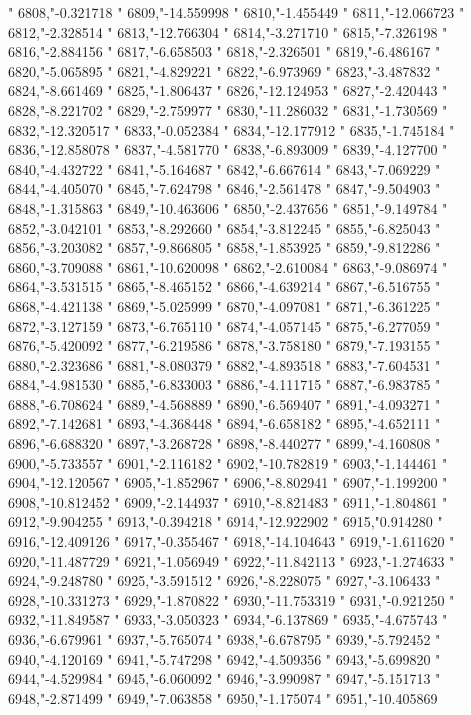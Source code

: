 "
6808,"-0.321718
"
6809,"-14.559998
"
6810,"-1.455449
"
6811,"-12.066723
"
6812,"-2.328514
"
6813,"-12.766304
"
6814,"-3.271710
"
6815,"-7.326198
"
6816,"-2.884156
"
6817,"-6.658503
"
6818,"-2.326501
"
6819,"-6.486167
"
6820,"-5.065895
"
6821,"-4.829221
"
6822,"-6.973969
"
6823,"-3.487832
"
6824,"-8.661469
"
6825,"-1.806437
"
6826,"-12.124953
"
6827,"-2.420443
"
6828,"-8.221702
"
6829,"-2.759977
"
6830,"-11.286032
"
6831,"-1.730569
"
6832,"-12.320517
"
6833,"-0.052384
"
6834,"-12.177912
"
6835,"-1.745184
"
6836,"-12.858078
"
6837,"-4.581770
"
6838,"-6.893009
"
6839,"-4.127700
"
6840,"-4.432722
"
6841,"-5.164687
"
6842,"-6.667614
"
6843,"-7.069229
"
6844,"-4.405070
"
6845,"-7.624798
"
6846,"-2.561478
"
6847,"-9.504903
"
6848,"-1.315863
"
6849,"-10.463606
"
6850,"-2.437656
"
6851,"-9.149784
"
6852,"-3.042101
"
6853,"-8.292660
"
6854,"-3.812245
"
6855,"-6.825043
"
6856,"-3.203082
"
6857,"-9.866805
"
6858,"-1.853925
"
6859,"-9.812286
"
6860,"-3.709088
"
6861,"-10.620098
"
6862,"-2.610084
"
6863,"-9.086974
"
6864,"-3.531515
"
6865,"-8.465152
"
6866,"-4.639214
"
6867,"-6.516755
"
6868,"-4.421138
"
6869,"-5.025999
"
6870,"-4.097081
"
6871,"-6.361225
"
6872,"-3.127159
"
6873,"-6.765110
"
6874,"-4.057145
"
6875,"-6.277059
"
6876,"-5.420092
"
6877,"-6.219586
"
6878,"-3.758180
"
6879,"-7.193155
"
6880,"-2.323686
"
6881,"-8.080379
"
6882,"-4.893518
"
6883,"-7.604531
"
6884,"-4.981530
"
6885,"-6.833003
"
6886,"-4.111715
"
6887,"-6.983785
"
6888,"-6.708624
"
6889,"-4.568889
"
6890,"-6.569407
"
6891,"-4.093271
"
6892,"-7.142681
"
6893,"-4.368448
"
6894,"-6.658182
"
6895,"-4.652111
"
6896,"-6.688320
"
6897,"-3.268728
"
6898,"-8.440277
"
6899,"-4.160808
"
6900,"-5.733557
"
6901,"-2.116182
"
6902,"-10.782819
"
6903,"-1.144461
"
6904,"-12.120567
"
6905,"-1.852967
"
6906,"-8.802941
"
6907,"-1.199200
"
6908,"-10.812452
"
6909,"-2.144937
"
6910,"-8.821483
"
6911,"-1.804861
"
6912,"-9.904255
"
6913,"-0.394218
"
6914,"-12.922902
"
6915,"0.914280
"
6916,"-12.409126
"
6917,"-0.355467
"
6918,"-14.104643
"
6919,"-1.611620
"
6920,"-11.487729
"
6921,"-1.056949
"
6922,"-11.842113
"
6923,"-1.274633
"
6924,"-9.248780
"
6925,"-3.591512
"
6926,"-8.228075
"
6927,"-3.106433
"
6928,"-10.331273
"
6929,"-1.870822
"
6930,"-11.753319
"
6931,"-0.921250
"
6932,"-11.849587
"
6933,"-3.050323
"
6934,"-6.137869
"
6935,"-4.675743
"
6936,"-6.679961
"
6937,"-5.765074
"
6938,"-6.678795
"
6939,"-5.792452
"
6940,"-4.120169
"
6941,"-5.747298
"
6942,"-4.509356
"
6943,"-5.699820
"
6944,"-4.529984
"
6945,"-6.060092
"
6946,"-3.990987
"
6947,"-5.151713
"
6948,"-2.871499
"
6949,"-7.063858
"
6950,"-1.175074
"
6951,"-10.405869
